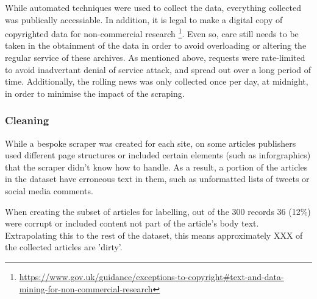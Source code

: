 While automated techniques were used to collect the data, everything collected was publically accessiable. In addition, it is legal to make a digital copy of copyrighted data for non-commercial research \footnote{\url{https://www.gov.uk/guidance/exceptions-to-copyright#text-and-data-mining-for-non-commercial-research}}. Even so, care still needs to be taken in the obtainment of the data in order to avoid overloading or altering the regular service of these archives. As mentioned above, requests were rate-limited to avoid inadvertant denial of service attack, and spread out over a long period of time. Additionally, the rolling news was only collected once per day, at midnight, in order to minimise the impact of the scraping.

\subsubsection{Cleaning}
While a bespoke scraper was created for each site, on some articles publishers used different page structures or included certain elements (such as inforgraphics) that the scraper didn't know how to handle. As a result, a portion of the articles in the dataset have erroneous text in them, such as unformatted lists of tweets or social media comments.

When creating the subset of articles for labelling, out of the 300 records 36 (12\%) were corrupt or included content not part of the article's body text. Extrapolating this to the rest of the dataset, this means approximately XXX of the collected articles are 'dirty'.
